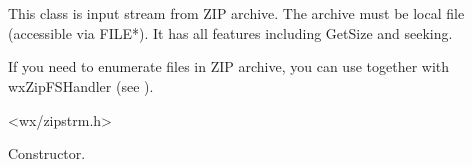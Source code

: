 %
%

\section{}\label{wxzipinputstream}

This class is input stream from ZIP archive. The archive
must be local file (accessible via FILE*).
It has all features including GetSize and seeking.


If you need to enumerate files in ZIP archive, you can use 
 together with wxZipFSHandler (see 
).





<wx/zipstrm.h>


\label{wxzipinputstreamwxzipinputstream}


Constructor.




